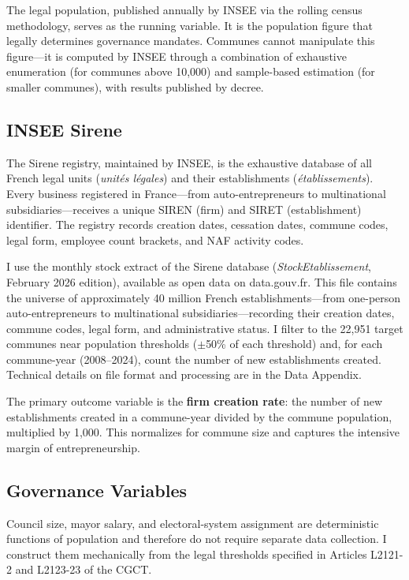 \documentclass[12pt]{article}
\begin{document}
The legal population, published annually by INSEE via the rolling census methodology, serves as the running variable. It is the population figure that legally determines governance mandates. Communes cannot manipulate this figure---it is computed by INSEE through a combination of exhaustive enumeration (for communes above 10,000) and sample-based estimation (for smaller communes), with results published by decree.

\subsection{INSEE Sirene}

The Sirene registry, maintained by INSEE, is the exhaustive database of all French legal units (\textit{unit\'{e}s l\'{e}gales}) and their establishments (\textit{\'{e}tablissements}). Every business registered in France---from auto-entrepreneurs to multinational subsidiaries---receives a unique SIREN (firm) and SIRET (establishment) identifier. The registry records creation dates, cessation dates, commune codes, legal form, employee count brackets, and NAF activity codes.

I use the monthly stock extract of the Sirene database (\textit{StockEtablissement}, February 2026 edition), available as open data on data.gouv.fr. This file contains the universe of approximately 40 million French establishments---from one-person auto-entrepreneurs to multinational subsidiaries---recording their creation dates, commune codes, legal form, and administrative status. I filter to the 22,951 target communes near population thresholds ($\pm$50\% of each threshold) and, for each commune-year (2008--2024), count the number of new establishments created. Technical details on file format and processing are in the Data Appendix.

The primary outcome variable is the \textbf{firm creation rate}: the number of new establishments created in a commune-year divided by the commune population, multiplied by 1,000. This normalizes for commune size and captures the intensive margin of entrepreneurship.

\subsection{Governance Variables}

Council size, mayor salary, and electoral-system assignment are deterministic functions of population and therefore do not require separate data collection. I construct them mechanically from the legal thresholds specified in Articles L2121-2 and L2123-23 of the CGCT.
\end{document}
